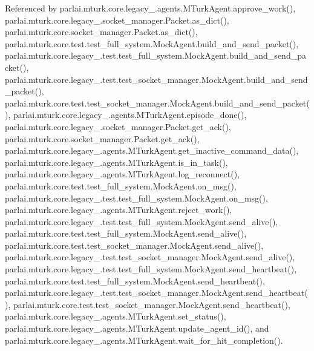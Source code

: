 Referenced by parlai.\+mturk.\+core.\+legacy\+\_.\+agents.\+M\+Turk\+Agent.\+approve\+\_\+work(), parlai.\+mturk.\+core.\+legacy\+\_.\+socket\+\_\+manager.\+Packet.\+as\+\_\+dict(), parlai.\+mturk.\+core.\+socket\+\_\+manager.\+Packet.\+as\+\_\+dict(), parlai.\+mturk.\+core.\+test.\+test\+\_\+full\+\_\+system.\+Mock\+Agent.\+build\+\_\+and\+\_\+send\+\_\+packet(), parlai.\+mturk.\+core.\+legacy\+\_.\+test.\+test\+\_\+full\+\_\+system.\+Mock\+Agent.\+build\+\_\+and\+\_\+send\+\_\+packet(), parlai.\+mturk.\+core.\+legacy\+\_.\+test.\+test\+\_\+socket\+\_\+manager.\+Mock\+Agent.\+build\+\_\+and\+\_\+send\+\_\+packet(), parlai.\+mturk.\+core.\+test.\+test\+\_\+socket\+\_\+manager.\+Mock\+Agent.\+build\+\_\+and\+\_\+send\+\_\+packet(), parlai.\+mturk.\+core.\+legacy\+\_.\+agents.\+M\+Turk\+Agent.\+episode\+\_\+done(), parlai.\+mturk.\+core.\+legacy\+\_.\+socket\+\_\+manager.\+Packet.\+get\+\_\+ack(), parlai.\+mturk.\+core.\+socket\+\_\+manager.\+Packet.\+get\+\_\+ack(), parlai.\+mturk.\+core.\+legacy\+\_.\+agents.\+M\+Turk\+Agent.\+get\+\_\+inactive\+\_\+command\+\_\+data(), parlai.\+mturk.\+core.\+legacy\+\_.\+agents.\+M\+Turk\+Agent.\+is\+\_\+in\+\_\+task(), parlai.\+mturk.\+core.\+legacy\+\_.\+agents.\+M\+Turk\+Agent.\+log\+\_\+reconnect(), parlai.\+mturk.\+core.\+test.\+test\+\_\+full\+\_\+system.\+Mock\+Agent.\+on\+\_\+msg(), parlai.\+mturk.\+core.\+legacy\+\_.\+test.\+test\+\_\+full\+\_\+system.\+Mock\+Agent.\+on\+\_\+msg(), parlai.\+mturk.\+core.\+legacy\+\_.\+agents.\+M\+Turk\+Agent.\+reject\+\_\+work(), parlai.\+mturk.\+core.\+legacy\+\_.\+test.\+test\+\_\+full\+\_\+system.\+Mock\+Agent.\+send\+\_\+alive(), parlai.\+mturk.\+core.\+test.\+test\+\_\+full\+\_\+system.\+Mock\+Agent.\+send\+\_\+alive(), parlai.\+mturk.\+core.\+test.\+test\+\_\+socket\+\_\+manager.\+Mock\+Agent.\+send\+\_\+alive(), parlai.\+mturk.\+core.\+legacy\+\_.\+test.\+test\+\_\+socket\+\_\+manager.\+Mock\+Agent.\+send\+\_\+alive(), parlai.\+mturk.\+core.\+legacy\+\_.\+test.\+test\+\_\+full\+\_\+system.\+Mock\+Agent.\+send\+\_\+heartbeat(), parlai.\+mturk.\+core.\+test.\+test\+\_\+full\+\_\+system.\+Mock\+Agent.\+send\+\_\+heartbeat(), parlai.\+mturk.\+core.\+legacy\+\_.\+test.\+test\+\_\+socket\+\_\+manager.\+Mock\+Agent.\+send\+\_\+heartbeat(), parlai.\+mturk.\+core.\+test.\+test\+\_\+socket\+\_\+manager.\+Mock\+Agent.\+send\+\_\+heartbeat(), parlai.\+mturk.\+core.\+legacy\+\_.\+agents.\+M\+Turk\+Agent.\+set\+\_\+status(), parlai.\+mturk.\+core.\+legacy\+\_.\+agents.\+M\+Turk\+Agent.\+update\+\_\+agent\+\_\+id(), and parlai.\+mturk.\+core.\+legacy\+\_.\+agents.\+M\+Turk\+Agent.\+wait\+\_\+for\+\_\+hit\+\_\+completion().

